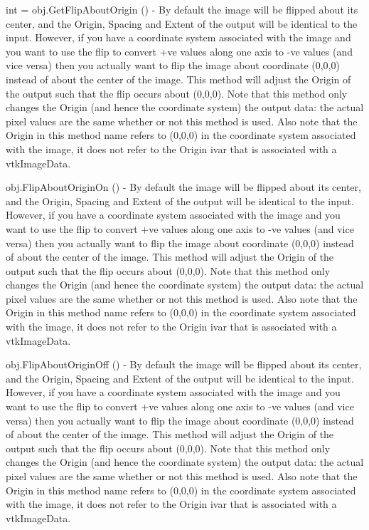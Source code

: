 \begin{DoxyItemize}
\item {\ttfamily int = obj.\-Get\-Flip\-About\-Origin ()} -\/ By default the image will be flipped about its center, and the Origin, Spacing and Extent of the output will be identical to the input. However, if you have a coordinate system associated with the image and you want to use the flip to convert +ve values along one axis to -\/ve values (and vice versa) then you actually want to flip the image about coordinate (0,0,0) instead of about the center of the image. This method will adjust the Origin of the output such that the flip occurs about (0,0,0). Note that this method only changes the Origin (and hence the coordinate system) the output data\-: the actual pixel values are the same whether or not this method is used. Also note that the Origin in this method name refers to (0,0,0) in the coordinate system associated with the image, it does not refer to the Origin ivar that is associated with a vtk\-Image\-Data.  
\item {\ttfamily obj.\-Flip\-About\-Origin\-On ()} -\/ By default the image will be flipped about its center, and the Origin, Spacing and Extent of the output will be identical to the input. However, if you have a coordinate system associated with the image and you want to use the flip to convert +ve values along one axis to -\/ve values (and vice versa) then you actually want to flip the image about coordinate (0,0,0) instead of about the center of the image. This method will adjust the Origin of the output such that the flip occurs about (0,0,0). Note that this method only changes the Origin (and hence the coordinate system) the output data\-: the actual pixel values are the same whether or not this method is used. Also note that the Origin in this method name refers to (0,0,0) in the coordinate system associated with the image, it does not refer to the Origin ivar that is associated with a vtk\-Image\-Data.  
\item {\ttfamily obj.\-Flip\-About\-Origin\-Off ()} -\/ By default the image will be flipped about its center, and the Origin, Spacing and Extent of the output will be identical to the input. However, if you have a coordinate system associated with the image and you want to use the flip to convert +ve values along one axis to -\/ve values (and vice versa) then you actually want to flip the image about coordinate (0,0,0) instead of about the center of the image. This method will adjust the Origin of the output such that the flip occurs about (0,0,0). Note that this method only changes the Origin (and hence the coordinate system) the output data\-: the actual pixel values are the same whether or not this method is used. Also note that the Origin in this method name refers to (0,0,0) in the coordinate system associated with the image, it does not refer to the Origin ivar that is associated with a vtk\-Image\-Data.  

\end{DoxyItemize}

